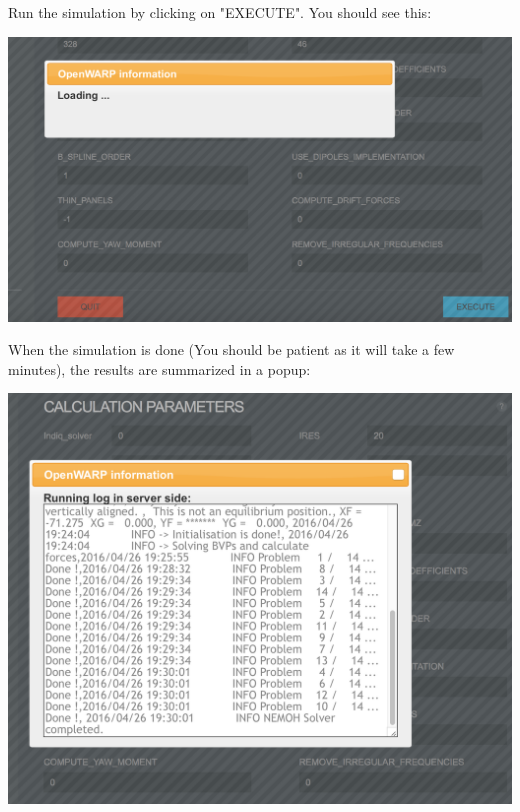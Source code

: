 \documentclass[12pt]{article}
\begin{document}
Run the simulation by clicking on "EXECUTE". You should see this:

\vspace{\abovedisplayskip}
\begin{minipage}{\linewidth}
	\centering
	\includegraphics[scale=0.5]{img/49}
\end{minipage}
\vspace{\belowdisplayskip}

When the simulation is done (You should be patient as it will take a few minutes), the results are summarized in a popup:

\vspace{\abovedisplayskip}
\begin{minipage}{\linewidth}
	\centering
	\includegraphics[scale=0.5]{img/50}
\end{minipage}
\vspace{\belowdisplayskip}
\end{document}
